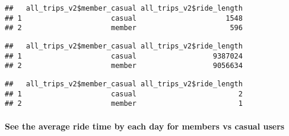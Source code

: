 \documentclass[
]{article}
\newenvironment{Shaded}{\begin{snugshade}}{\end{snugshade}}
\newcommand{\AttributeTok}[1]{\textcolor[rgb]{0.77,0.63,0.00}{#1}}
\newcommand{\FunctionTok}[1]{\textcolor[rgb]{0.00,0.00,0.00}{#1}}
\newcommand{\NormalTok}[1]{#1}
\newcommand{\SpecialCharTok}[1]{\textcolor[rgb]{0.00,0.00,0.00}{#1}}
\begin{document}
\begin{verbatim}
##   all_trips_v2$member_casual all_trips_v2$ride_length
## 1                     casual                     1548
## 2                     member                      596
\end{verbatim}

\begin{Shaded}
\end{Shaded}

\begin{verbatim}
##   all_trips_v2$member_casual all_trips_v2$ride_length
## 1                     casual                  9387024
## 2                     member                  9056634
\end{verbatim}

\begin{Shaded}
\end{Shaded}

\begin{verbatim}
##   all_trips_v2$member_casual all_trips_v2$ride_length
## 1                     casual                        2
## 2                     member                        1
\end{verbatim}

\hypertarget{see-the-average-ride-time-by-each-day-for-members-vs-casual-users}{%
\paragraph{See the average ride time by each day for members vs casual
users}\label{see-the-average-ride-time-by-each-day-for-members-vs-casual-users}}

\begin{Shaded}
\end{Shaded}
\end{document}
